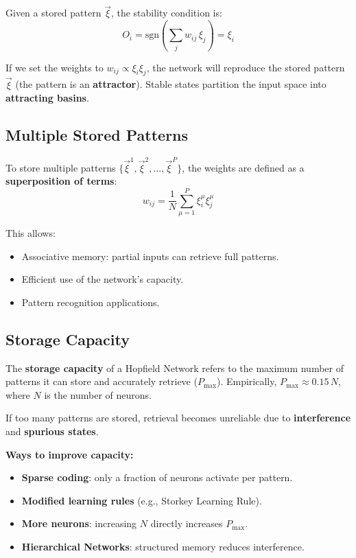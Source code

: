 \documentclass[11pt,a4paper]{article}
\newcommand{\sgn}{\text{sgn}}
\begin{document}
\begin{definitionbox}[title=Stable Pattern]
Given a stored pattern $\vec{\xi}$, the stability condition is:
\[
O_i = \sgn\!\left(\sum_j w_{ij}\, \xi_j\right) = \xi_i
\]
\end{definitionbox}

If we set the weights to $w_{ij} \propto \xi_i \xi_j$, the network will reproduce the stored pattern $\vec{\xi}$ (the pattern is an \textbf{attractor}). Stable states partition the input space into \textbf{attracting basins}.

\subsection{Multiple Stored Patterns}

To store multiple patterns $\{\vec{\xi}^1, \vec{\xi}^2, \ldots, \vec{\xi}^P\}$, the weights are defined as a \textbf{superposition of terms}:
\[
w_{ij} = \frac{1}{N}\sum_{\mu=1}^{P} \xi_i^{\mu} \xi_j^{\mu}
\]

This allows:
\begin{itemize}[leftmargin=*]
    \item Associative memory: partial inputs can retrieve full patterns.
    \item Efficient use of the network's capacity.
    \item Pattern recognition applications.
\end{itemize}

\subsection{Storage Capacity}

\begin{keybox}
The \textbf{storage capacity} of a Hopfield Network refers to the maximum number of patterns it can store and accurately retrieve ($P_{\max}$). Empirically, $P_{\max} \approx 0.15\,N$, where $N$ is the number of neurons.
\end{keybox}

If too many patterns are stored, retrieval becomes unreliable due to \textbf{interference} and \textbf{spurious states}.

\textbf{Ways to improve capacity:}
\begin{itemize}[leftmargin=*]
    \item \textbf{Sparse coding}: only a fraction of neurons activate per pattern.
    \item \textbf{Modified learning rules} (e.g., Storkey Learning Rule).
    \item \textbf{More neurons}: increasing $N$ directly increases $P_{\max}$.
    \item \textbf{Hierarchical Networks}: structured memory reduces interference.
\end{itemize}
\end{document}
